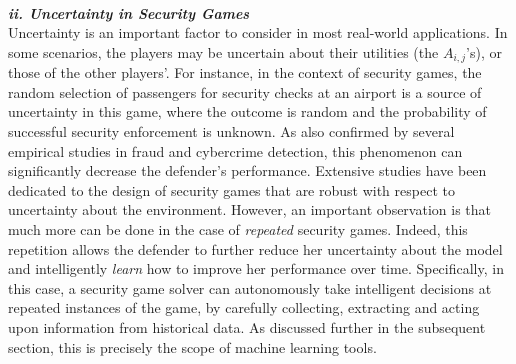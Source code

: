 
\noindent \textbf{\textit{\\ii. Uncertainty in Security Games}}\\
Uncertainty is an important factor to consider in most real-world applications. 
In some scenarios, the players may be uncertain about their utilities (the $A_{i,j}$'s), or those of the other players'. For instance, in the context of security games, the random selection of passengers for security checks at an airport is a source of uncertainty in this game, where the outcome is random and the probability of successful security enforcement  is unknown. 
As also confirmed by several empirical studies in fraud and cybercrime detection, this phenomenon can significantly decrease the defender's performance\cite{granick2005faking, swire2009no}.
Extensive studies have been dedicated to the design of security games that are robust with respect to uncertainty about the environment\cite{aghassi2006robust,Nguyen14RO, Kiekintveld:2013}. 
However, an important observation is that much more can be done in the case of {\em repeated} security games.  
Indeed, this repetition allows the defender to further reduce her uncertainty about the model and intelligently {\em learn} how to improve her performance over time. Specifically, in this case, a security game solver can autonomously take intelligent decisions at repeated instances of the game, by carefully collecting, extracting and acting upon information from historical data. As discussed further in the subsequent section, this is precisely the scope of machine learning tools. 

